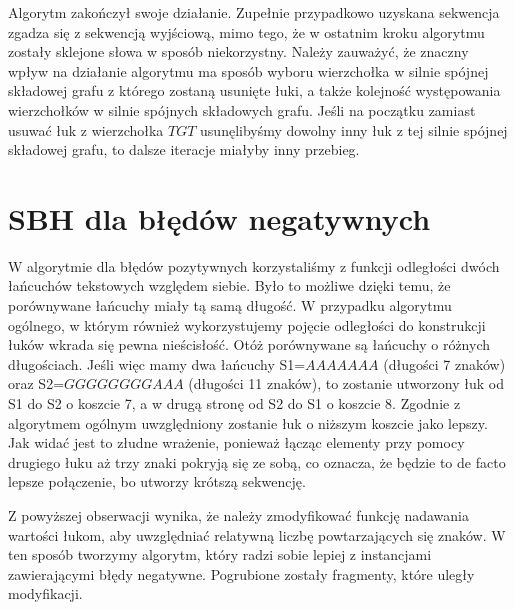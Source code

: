 \documentclass[a4paper,10pt]{article}
\begin{document}
Algorytm zakończył swoje działanie. Zupełnie przypadkowo uzyskana sekwencja zgadza się z sekwencją wyjściową, mimo tego, że w ostatnim kroku algorytmu zostały sklejone słowa w sposób niekorzystny.
Należy zauważyć, że znaczny wpływ na działanie algorytmu ma sposób wyboru wierzchołka w silnie spójnej składowej grafu z którego zostaną usunięte łuki, a także kolejność występowania wierzchołków w silnie spójnych składowych grafu. Jeśli na początku zamiast usuwać łuk z wierzchołka $TGT$ usunęlibyśmy dowolny inny łuk z tej silnie spójnej składowej grafu, to dalsze iteracje miałyby inny przebieg.

\section{SBH dla błędów negatywnych}
W algorytmie dla błędów pozytywnych korzystaliśmy z funkcji odległości dwóch łańcuchów tekstowych względem siebie. Było to możliwe dzięki temu, że porównywane łańcuchy miały tą samą długość. W przypadku algorytmu ogólnego, w którym również wykorzystujemy pojęcie odległości do konstrukcji łuków wkrada się pewna nieścisłość. Otóż porównywane są łańcuchy o różnych długościach. Jeśli więc mamy dwa łańcuchy S1=$AAAAAAA$ (długości 7 znaków) oraz S2=$GGGGGGGGAAA$ (długości 11 znaków), to zostanie utworzony łuk od S1 do S2 o koszcie 7, a w drugą stronę od S2 do S1 o koszcie 8. Zgodnie z algorytmem ogólnym uwzględniony zostanie łuk o niższym koszcie jako lepszy. Jak widać jest to złudne wrażenie, ponieważ łącząc elementy przy pomocy drugiego łuku aż trzy znaki pokryją się ze sobą, co oznacza, że będzie to de facto lepsze połączenie, bo utworzy krótszą sekwencję.

Z powyższej obserwacji wynika, że należy zmodyfikować funkcję nadawania wartości łukom, aby uwzględniać relatywną liczbę powtarzających się znaków. W ten sposób tworzymy algorytm, który radzi sobie lepiej z instancjami zawierającymi błędy negatywne. Pogrubione zostały fragmenty, które uległy modyfikacji.
\end{document}

